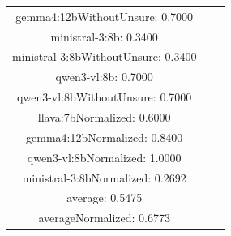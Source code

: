 \documentclass[a4paper]{article}
\begin{document}
\begin{tabular}{ccc}
gemma4:12bWithoutUnsure: 0.7000 \\ ministral-3:8b: 0.3400 \\ ministral-3:8bWithoutUnsure: 0.3400 \\ qwen3-vl:8b: 0.7000 \\ qwen3-vl:8bWithoutUnsure: 0.7000 \\ llava:7bNormalized: 0.6000 \\ gemma4:12bNormalized: 0.8400 \\ qwen3-vl:8bNormalized: 1.0000 \\ ministral-3:8bNormalized: 0.2692 \\ average: 0.5475 \\ averageNormalized: 0.6773 \end{minipage}\\
\end{tabular}

\vspace{5mm}
\end{document}
